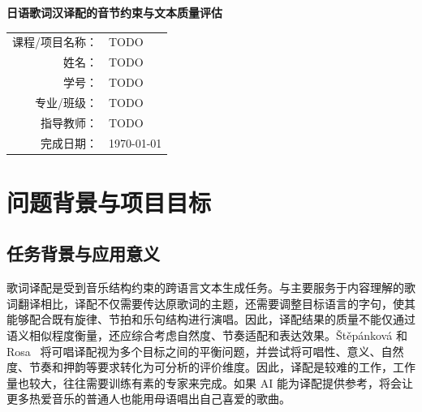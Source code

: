 \documentclass[12pt, a4paper]{ctexart}
\numberwithin{table}{section}
\numberwithin{figure}{section}
\begin{document}
\begin{titlepage}
  \centering
  \vspace*{3cm}
  {\Huge\bfseries 日语歌词汉译配的音节约束与文本质量评估\par}
  \vspace{2.5cm}
  {\large
    \begin{tabular}{rl}
      课程/项目名称： & TODO \\
      姓名：         & TODO \\
      学号：         & TODO \\
      专业/班级：    & TODO \\
      指导教师：     & TODO \\
      完成日期：     & \today \\
    \end{tabular}
  \par}
  \vfill
\end{titlepage}

\begin{abstract}
\noindent
日语歌词汉译配需兼顾情绪表达与音节匹配，中文直译偏短及模型计数不准增加了难度。本项目引入人工音节预算和分组标注，结合意境分析、初稿生成、诗歌检索改写与程序校验返修，构建可追溯的译配流程。以论文原提示词、人工标注适配和单次归档 writer 为对照，在 19 首歌曲、380 个有效乐句上开展规则统计与匿名模型评审。人工预算适配使通过率由 12.85\% 升至 39.81\%，完整流程达到 100\%，表现力为 3.91/5，但核心语义保留较弱。无 RAG 流程同样全部达标，RAG 文本偏好胜率为 57.87\%，尚未确认稳定增益。结果说明，程序校验可提高约束执行的可靠性，但译配仍需权衡音节与文本质量，实际可唱性有待真人试唱验证。

\vspace{0.5em}
\noindent\textbf{关键词：}\ 日语歌词汉译配；音节预算；检索增强生成；迭代改写；大模型评价
\end{abstract}

\newpage
\tableofcontents
\newpage

\section{问题背景与项目目标}

\subsection{任务背景与应用意义}
歌词译配是受到音乐结构约束的跨语言文本生成任务。与主要服务于内容理解的歌词翻译相比，译配不仅需要传达原歌词的主题，还需要调整目标语言的字句，使其能够配合既有旋律、节拍和乐句结构进行演唱。因此，译配结果的质量不能仅通过语义相似程度衡量，还应综合考虑自然度、节奏适配和表达效果。Štěpánková 和 Rosa~\cite{stepankova-rosa-2025-song} 将可唱译配视为多个目标之间的平衡问题，并尝试将可唱性、意义、自然度、节奏和押韵等要求转化为可分析的评价维度。因此，译配是较难的工作，工作量也较大，往往需要训练有素的专家来完成。如果 AI 能为译配提供参考，将会让更多热爱音乐的普通人也能用母语唱出自己喜爱的歌曲。
\end{document}
